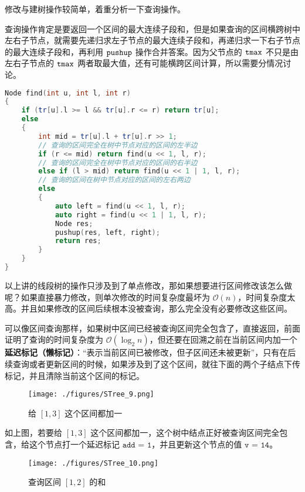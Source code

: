 修改与建树操作较简单，着重分析一下查询操作。

查询操作肯定是要返回一个区间的最大连续子段和，但是如果查询的区间横跨树中左右子节点，就需要先递归求左子节点的最大连续子段和，再递归求一下右子节点的最大连续子段和，再利用 $\tt pushup$ 操作合并答案。因为父节点的 $\tt tmax$ 不只是由左右子节点的 $\tt tmax$ 两者取最大值，还有可能横跨区间计算，所以需要分情况讨论。

\begin{lstlisting}[language=cpp]
Node find(int u, int l, int r)
{
    if (tr[u].l >= l && tr[u].r <= r) return tr[u];
    else 
    {
        int mid = tr[u].l + tr[u].r >> 1;
        // 查询的区间完全在树中节点对应的区间的左半边
        if (r <= mid) return find(u << 1, l, r);    
        // 查询的区间完全在树中节点对应的区间的右半边
        else if (l > mid) return find(u << 1 | 1, l, r);
        // 查询的区间在树中节点对应的区间的左右两边
        else 
        {
            auto left = find(u << 1, l, r);
            auto right = find(u << 1 | 1, l, r);
            Node res;
            pushup(res, left, right);
            return res;
        }
    }
}
\end{lstlisting}

以上讲的线段树的操作只涉及到了单点修改，那如果想要进行区间修改该怎么做呢？如果直接暴力修改，则单次修改的时间复杂度最坏为 $\mathcal{O}(n)$，时间复杂度太高。并且如果修改的区间后续根本没被查询，那么完全没有必要修改这些区间。

可以像区间查询那样，如果树中区间已经被查询区间完全包含了，直接返回，前面证明了查询的时间复杂度为 $\mathcal{O}(\log_2 n)$，但还要在回溯之前在当前区间内加一个\textbf{延迟标记（懒标记）}：“表示当前区间已被修改，但子区间还未被更新”，只有在后续查询或者更新区间的时候，如果涉及到了这个区间，就往下面的两个子结点下传标记，并且清除当前这个区间的标记。

\begin{figure}[ht]
\centering
\texttt{[image: ./figures/STree\_9.png]}
\caption{给 $[1, 3]$ 这个区间都加一} \label{STree_fig9}
\end{figure}

如上图，若要给 $[1, 3]$ 这个区间都加一，这个树中结点正好被查询区间完全包含，给这个节点打一个延迟标记 $\texttt{add = 1}$，并且更新这个节点的值 $\texttt{v = 14}$。

\begin{figure}[ht]
\centering
\texttt{[image: ./figures/STree\_10.png]}
\caption{查询区间 $[1, 2]$ 的和} \label{STree_fig10}
\end{figure}

